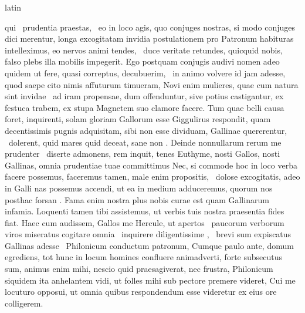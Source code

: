 \documentclass[12pt]{book}
\renewenvironment{latin}
    	{\begin{hyphenrules}{latin}}
    	{\end{hyphenrules}}
\begin{document}
\begin{pages}
\begin{latin}
\begin{Leftside}
                  qui   \ampersand\ prudentia praestas,  \ampersand\ eo in loco  agis, 
                  quo conjuges nostras, si modo conjuges dici merentur, longa excogitatam invidia postulationem pro Patronum habituras intelleximus, eo nervos animi tendes,  \ampersand\ duce veritate retundes, 
                  quicquid nobis, falso plebs illa mobilis impegerit. Ego postquam conjugis audivi nomen adeo quidem  ut fere, 
                  quasi  correptus, decubuerim,  \ampersand\ in animo volvere  id jam adesse,
                  quod saepe cito nimis affuturum timueram, Novi enim mulieres, quae cum natura sint invidae  \ampersand\ ad iram propensae, dum offenduntur, sive potius castigantur, ex festuca trabem, ex stupa Magnetem suo clamore facere.
                  Tum quae belli causa foret, inquirenti, solam gloriam Gallorum esse Giggulirus respondit, quam decentissimis pugnis adquisitam, sibi non esse dividuam, Gallinae quererentur,  \ampersand\ dolerent,
                  quid mares quid  deceat, sane non .
                  Deinde nonnullarum rerum me prudenter  \ampersand\ diserte admonens, rem inquit, tenes Euthyme,  nosti Gallos, nosti Gallinas, omnia prudentiae tuae committimus
                  Nec, si commode hoc in loco verba facere possemus, faceremus tamen, male enim propositis,  \ampersand\ dolose excogitatis, adeo in Galli nas possemus accendi,
                  ut ea in medium adduceremus, quorum nos posthac forsan . Fama enim nostra plus nobis curae est quam Gallinarum infamia.
                  Loquenti tamen tibi assistemus, ut verbis tuis nostra praesentia fides fiat. Haec cum audissem, Gallos me Hercule, ut apertos  \ampersand\ paucorum verborum viros miseratus cogitare omnia 
                   \ampersand\ inquirere diligentissime ,  \ampersand\ brevi sum expiscatus Gallinas adesse
                   \ampersand\ Philonicum conductum patronum, Cumque paulo ante, domum egrediens, tot hunc in locum homines confluere animadverti, forte subsecutus sum, animus enim mihi, nescio quid praesagiverat,
                  nec frustra, Philonicum siquidem ita anhelantem vidi, ut folles mihi sub pectore premere videret, Cui me locuturo opposui, ut omnia quibus respondendum esse videretur ex eius ore colligerem.

\end{Leftside}
\end{latin}
\end{pages}
\end{document}
